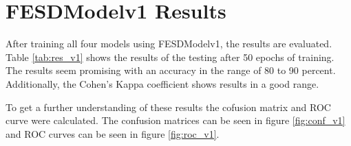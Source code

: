 \section{FESDModelv1 Results}
\label{sec:FESDModelv1_results}

After training all four models using FESDModelv1, the results are evaluated. Table \ref{tab:res_v1} shows the results of the testing after 50 epochs of training. The results seem promising with an accuracy in the range of 80 to 90 percent. Additionally, the Cohen's Kappa coefficient shows results in a good range.



To get a further understanding of these results the cofusion matrix and ROC curve were calculated. The confusion matrices can be seen in figure \ref{fig:conf_v1} and ROC curves can be seen in figure \ref{fig:roc_v1}.

